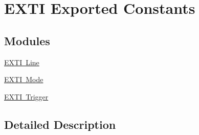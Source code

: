 \hypertarget{group___e_x_t_i___exported___constants}{}\section{E\+X\+TI Exported Constants}
\label{group___e_x_t_i___exported___constants}
\subsection*{Modules}
\begin{DoxyCompactItemize}
\item 
\mbox{\hyperlink{group___e_x_t_i___line}{E\+X\+T\+I Line}}
\item 
\mbox{\hyperlink{group___e_x_t_i___mode}{E\+X\+T\+I Mode}}
\item 
\mbox{\hyperlink{group___e_x_t_i___trigger}{E\+X\+T\+I Trigger}}
\end{DoxyCompactItemize}


\subsection{Detailed Description}

